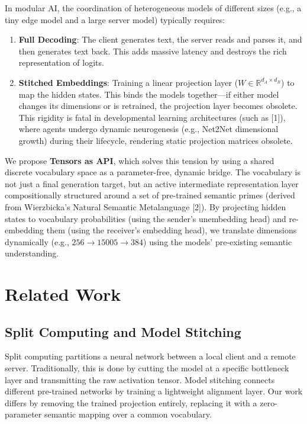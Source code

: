\documentclass{article}
\begin{document}
In modular AI, the coordination of heterogeneous models of different sizes (e.g., a tiny edge model and a large server model) typically requires:
\begin{enumerate}
	\item \textbf{Full Decoding}: The client generates text, the server reads and parses it, and then generates text back. This adds massive latency and destroys the rich representation of logits.
	\item \textbf{Stitched Embeddings}: Training a linear projection layer ($W \in \mathbb{R}^{d_A \times d_B}$) to map the hidden states. This binds the models together---if either model changes its dimensions or is retrained, the projection layer becomes obsolete. This rigidity is fatal in developmental learning architectures (such as [1]), where agents undergo dynamic neurogenesis (e.g., Net2Net dimensional growth) during their lifecycle, rendering static projection matrices obsolete.
\end{enumerate}

We propose \textbf{Tensors as API}, which solves this tension by using a shared discrete vocabulary space as a parameter-free, dynamic bridge. The vocabulary is not just a final generation target, but an active intermediate representation layer compositionally structured around a set of pre-trained semantic primes (derived from Wierzbicka's Natural Semantic Metalanguage [2]). By projecting hidden states to vocabulary probabilities (using the sender's unembedding head) and re-embedding them (using the receiver's embedding head), we translate dimensions dynamically (e.g., $256 \rightarrow 15005 \rightarrow 384$) using the models' pre-existing semantic understanding.

\section{Related Work}

\subsection{Split Computing and Model Stitching}
Split computing partitions a neural network between a local client and a remote server. Traditionally, this is done by cutting the model at a specific bottleneck layer and transmitting the raw activation tensor. Model stitching connects different pre-trained networks by training a lightweight alignment layer. Our work differs by removing the trained projection entirely, replacing it with a zero-parameter semantic mapping over a common vocabulary.
\end{document}
